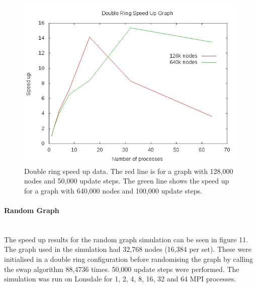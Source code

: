 \documentclass[pdftex,12pt,a4paper]{article}
\begin{document}
\begin{figure}
\centering
\includegraphics[scale=0.8]{dr_speed.jpg}
\caption{Double ring speed up data. The red line is for a graph with 128,000 nodes and 50,000 update steps. The green line shows the speed up for a graph with 640,000 nodes and 100,000 update steps.}
\end{figure}



\paragraph{Random Graph} ~\\

The speed up results for the random graph simulation can be seen in figure 11. The graph used in the simulation had 32,768 nodes (16,384 per set). These were initialised in a double ring configuration before randomising the graph by calling the swap algorithm 88,4736 times. 50,000 update steps were performed. The simulation was run on Lonsdale for 1, 2, 4, 8, 16, 32 and 64 MPI processes. 
\end{document}
